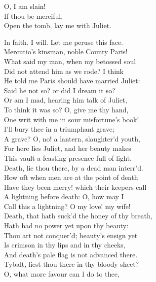 \begin{speech}
O, I am slain!  \\
If thou be merciful, \\
Open the tomb, lay me with Juliet.  \\
\end{speech}
\begin{speech}
In faith, I will. Let me peruse this face. \\
Mercutio's kinsman, noble County Paris! \\
What said my man, when my betossed soul \\
Did not attend him as we rode?   I think \\
He told me Paris should have married Juliet: \\
Said he not so? or did I dream it so? \\
Or am I mad, hearing him talk of Juliet, \\
To think it was so?   O, give me thy hand, \\
One writ with me in sour misfortune's book! \\
I'll bury thee in a triumphant grave; \\
A grave?   O, no! a lantern, slaughter'd youth, \\
For here lies Juliet, and her beauty makes \\
This vault a feasting presence full of light. \\
Death, lie thou there, by a dead man interr'd. 
\\
How oft when men are at the point of death \\
Have they been merry! which their keepers call \\
A lightning before death: O, how may I \\
Call this a lightning?   O my love! my wife! \\
Death, that hath suck'd the honey of thy breath, \\
Hath had no power yet upon thy beauty: \\
Thou art not conquer'd; beauty's ensign yet \\
Is crimson in thy lips and in thy cheeks, \\
And death's pale flag is not advanced there. \\
Tybalt, liest thou there in thy bloody sheet? \\
O, what more favour can I do to thee, \\

\end{speech}

